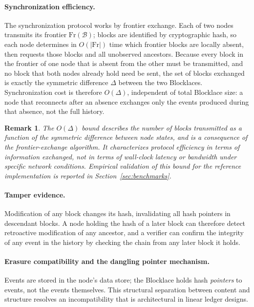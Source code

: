 \documentclass[12pt]{article}
\newtheorem{remark}{Remark}[section]
\newcommand{\Blocklace}{\mathcal{B}}
\newcommand{\Fr}{\mathrm{Fr}}
\begin{document}
	\paragraph{Synchronization efficiency.}
	
	The synchronization protocol works by frontier exchange. Each of two
	nodes transmits its frontier $\Fr(\Blocklace)$; blocks are identified
	by cryptographic hash, so each node determines in $O(|\Fr|)$ time
	which frontier blocks are locally absent, then requests those blocks
	and all unobserved ancestors. Because every block in the frontier of
	one node that is absent from the other must be transmitted, and no
	block that both nodes already hold need be sent, the set of blocks
	exchanged is exactly the symmetric difference $\Delta$ between the two
	Blocklaces. Synchronization cost is therefore $O(\Delta)$, independent
	of total Blocklace size: a node that reconnects after an absence
	exchanges only the events produced during that absence, not the full
	history.
	
	\begin{remark}
		\label{remark:odelta}
		The $O(\Delta)$ bound describes the number of blocks transmitted as
		a function of the symmetric difference between node states, and is a
		consequence of the frontier-exchange algorithm. It characterizes
		protocol efficiency in terms of information exchanged, not in terms
		of wall-clock latency or bandwidth under specific network conditions.
		Empirical validation of this bound for the reference implementation
		is reported in Section~\ref{sec:benchmarks}.
	\end{remark}
	
	\paragraph{Tamper evidence.}
	
	Modification of any block changes its hash, invalidating all hash
	pointers in descendant blocks. A node holding the hash of a later
	block can therefore detect retroactive modification of any ancestor,
	and a verifier can confirm the integrity of any event in the history
	by checking the chain from any later block it holds.
	
	\paragraph{Erasure compatibility and the dangling pointer mechanism.}
	\label{sec:erasure}
	
	Events are stored in the node's data store; the Blocklace holds hash
	\emph{pointers} to events, not the events themselves. This structural
	separation between content and structure resolves an incompatibility
	that is architectural in linear ledger designs.
	
\end{document}
